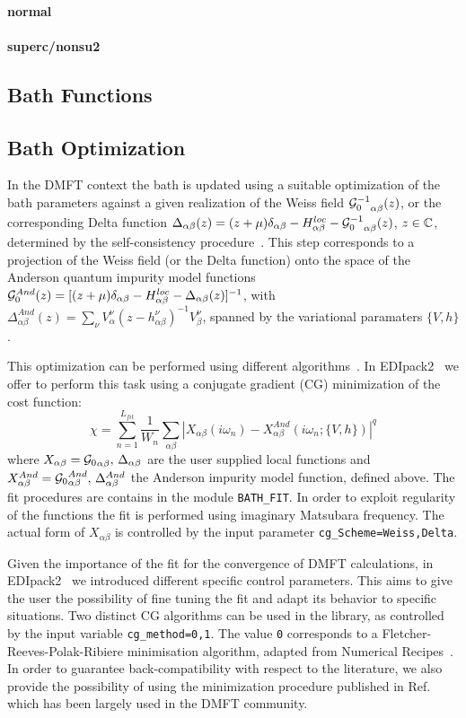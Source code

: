 \documentclass[final,3p,10pt]{elsarticle}
\newcommand{\onlinecite}[1]{\nocite{#1}\hspace{-0.1cm}\citenum{#1}}
\def\a{\alpha}       \def\b{\beta}   \def\g{\gamma}   \def\d{\delta}
\def\GG{{\cal G}} \def\SS{{\cal S}}
\def\NAME{{\rm EDIpack2 }}
\begin{document}
\paragraph{{\bf normal}}


\paragraph{{\bf superc/nonsu2}}




\subsection{Bath Functions}\label{sSecFunc}

\subsection{Bath Optimization}\label{sSecFit}
In the DMFT context the bath is updated using a suitable 
optimization of the bath parameters against a given realization of the Weiss field
${\GG^{-1}_{0}}_{\a\b}(z)$, or the corresponding Delta function
$\Delta_{\a\b}(z)= (z + \mu)\delta_{\a\b} - H^{loc}_{\a\b}-
{\GG^{-1}_0}_{\a\b}(z)$, $z\in\mathbb{C}$, determined by the self-consistency procedure~\cite{Georges1996RMP}.
This step corresponds to a projection of the Weiss
field (or the Delta function) onto the space of the Anderson quantum
impurity model functions
$\GG^{And}_0(z) =
[(z + \mu)\delta_{\a\b} - H^{loc}_{\a\b} -
\Delta_{\a\b}(z)]^{-1}$, with $\Delta^{And}_{\a\b}(z)=\sum_\nu
{V^\nu_{\a}}(z-h^\nu_{\a\b})^{-1}V^\nu_{\b}$, spanned by the
variational paramaters $\{V,h\}$.

This  optimization can be performed using different
  algorithms~\cite{Garcia2004PRL,Taranto2012PRB}. 
  In \NAME\ we offer to perform this task using a  
conjugate gradient (CG) minimization of the cost function:
$$
\chi = \sum_{n=1}^{L_{fit}}\frac{1}{W_n}\sum_{\a\b}|X_{\a\b}(i\omega_n) - X_{\a\b}^{And}(i\omega_n;\{V,h\})|^q
$$
where $X_{\a\b}={\GG_{0}}_{\a\b},\,\Delta_{\a\b}$ are the user
supplied local functions  and
$X_{\a\b}^{And}={\GG_0}^{And}_{\a\b},\,\Delta^{And}_{\a\b}$ the
Anderson impurity model function, defined above.
The fit procedures are contains in the module \texttt{BATH\_FIT}.  
In order to exploit regularity of the functions the fit is 
performed using imaginary Matsubara frequency. 
The actual form of $X_{\a\b}$ is controlled by the input parameter
\texttt{cg\_Scheme=Weiss,Delta}. 

Given the importance of the fit for the convergence of DMFT calculations, in \NAME\ we
introduced different specific control parameters. This aims to give
the user the possibility of fine tuning the fit and adapt its behavior to
specific situations.
Two distinct CG algorithms can be used in the library, as controlled by the input variable
\texttt{cg\_method=0,1}. The value \texttt{0} corresponds to a
Fletcher-Reeves-Polak-Ribiere minimisation algorithm, adapted from
Numerical Recipes~\cite{NumRec77}. In order to guarantee
back-compatibility with respect to the literature, we also provide the
possibility of using the minimization procedure published in
Ref.\onlinecite{Georges1996RMP} which has been largely used in the DMFT
community.
\end{document}
